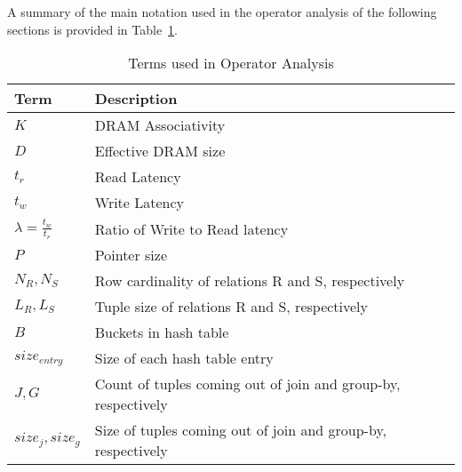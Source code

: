 A summary of the main notation used in the operator analysis of the
following sections is provided in Table~\ref{tab:notations}.


\begin{table}[!h]
\centering
\caption{Terms used in Operator Analysis}
\label{tab:notations}
\begin{small}
\begin{tabular}{p{1.6cm}p{6.2cm}}
\toprule  
\textbf{Term} & \textbf{Description}\\ 
\midrule
\textbf{$K$} & DRAM Associativity\\
\textbf{$D$} & Effective DRAM size\\
\textbf{$t_r$} & Read Latency\\
\textbf{$t_w$} & Write Latency\\
\textbf{$\lambda = \frac{t_w}{t_r}$} & Ratio of Write to Read latency \\
\textbf{$P$} & Pointer size\\
\textbf{$N_R, N_S$} & Row cardinality of relations R and S, respectively\\
\textbf{$L_R, L_S$} & Tuple size of relations R and S, respectively\\
\textbf{$B$} & Buckets in hash table\\
\textbf{$size_{entry}$} & Size of each hash table entry\\
\textbf{$J,G$} & Count of tuples coming out of join and group-by, respectively\\
\textbf{$size_{j},size_{g}$} & Size of tuples coming out of join and group-by, respectively\\
\bottomrule
\end{tabular}
\end{small}
\end{table}